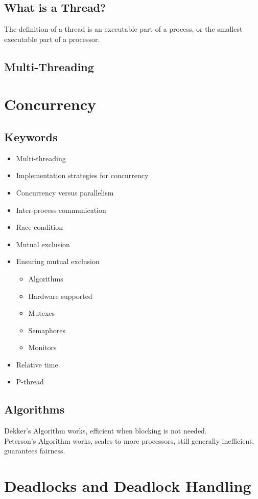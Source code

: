 \documentclass{report}
\begin{document}
\section{What is a Thread?}
The definition of a thread is an executable part of a process, or the smallest executable part of a processor.

\section{Multi-Threading}


\chapter{Concurrency}

\section{Keywords}
\begin{itemize}
\item Multi-threading
\item Implementation strategies for concurrency
\item Concurrency versus parallelism
\item Inter-process communication
\item Race condition
\item Mutual exclusion
\item Ensuring mutual exclusion
\begin{itemize}
\item Algorithms
\item Hardware supported
\item Mutexes
\item Semaphores
\item Monitors
\end{itemize}
\item Relative time
\item P-thread
\end{itemize}
\newpage
\section{Algorithms}
Dekker's Algorithm works, efficient when blocking is not needed.
\\
Peterson's Algorithm works, scales to more processors, still generally inefficient, guarantees fairness.
\\

\chapter{Deadlocks and Deadlock Handling}
\end{document}
